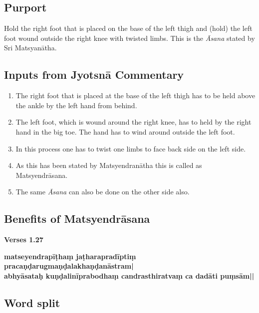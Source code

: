 \subsection*{Purport}
\vspace{-10pt}

Hold the right foot that is placed on the base of the left thigh and (hold) the left foot wound outside the right knee with twisted limbs. This is the \textit{Āsana} stated by Sri Matsyanātha.
\vspace{-10pt}

\subsection*{Inputs from Jyotsnā Commentary}
\vspace{-10pt}

\begin{enumerate}
\itemsep=0pt
\item The right foot that is placed at the base of the left thigh has to be held above the ankle by the left hand from behind. 
\item The left foot, which is wound around the right knee, has to held by the right hand in the big toe. The hand has to wind around outside the left foot. 
\item In this process one has to twist one limbs to face back side on the left side.
\item As this has been stated by Matsyendranātha this is called as Matsyendrāsana. 
\item The same \textit{Āsana} can also be done on the other side also.  
\end{enumerate}

\subsection*{Benefits of Matsyendrāsana}

\noindent 
\textbf{Verses 1.27}

\begin{shloka}
\textbf{matseyendrapīṭhaṃ jaṭharapradīptiṃ pracaṇḍarugmaṇḍalakhaṇḍanāstram|}\\
\textbf{abhyāsataḥ kuṇḍalinīprabodhaṃ candrasthiratvaṃ ca dadāti puṃsām||}
\end{shloka}

\subsection*{Word split}

